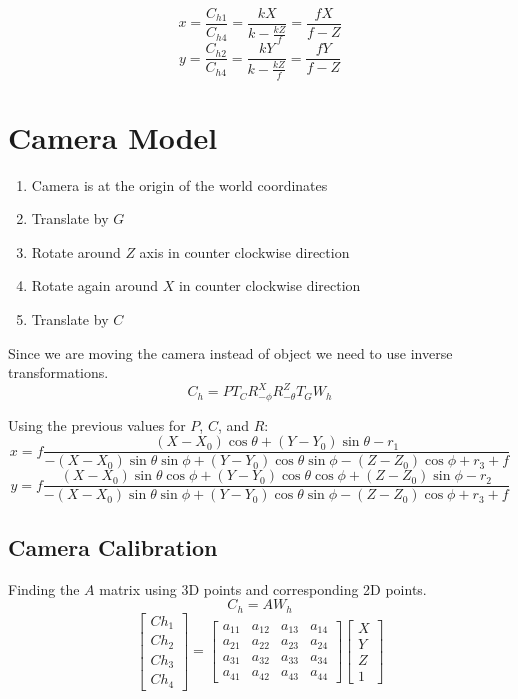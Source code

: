 \documentclass{article}
\begin{document}
\[x=\frac{C_{h1}}{C_{h4}}=\frac{kX}{k-\frac{kZ}{f}}=\frac{fX}{f-Z}\]
\[y=\frac{C_{h2}}{C_{h4}}=\frac{kY}{k-\frac{kZ}{f}}=\frac{fY}{f-Z}\]

\section*{Camera Model}
\begin{enumerate}
    \item Camera is at the origin of the world coordinates
    \item Translate by $G$
    \item Rotate around $Z$ axis in counter clockwise direction
    \item Rotate again around $X$ in counter clockwise direction
    \item Translate by $C$
\end{enumerate}
Since we are moving the camera instead of object we need to use inverse transformations.
\[C_h=P T_C R_{-\phi}^X R_{-\theta}^Z T_G W_h\]

Using the previous values for $P$, $C$, and $R$:
\[x=f\frac{(X-X_0)\cos\theta + (Y-Y_0)\sin\theta - r_1}{-(X-X_0)\sin\theta\sin\phi +
(Y-Y_0)\cos\theta\sin\phi - (Z-Z_0)\cos\phi + r_3 + f}\]
\[y=f\frac{(X-X_0)\sin\theta\cos\phi + (Y-Y_0)\cos\theta\cos\phi + (Z-Z_0)\sin\phi -
r_2}{-(X-X_0)\sin\theta\sin\phi + (Y-Y_0)\cos\theta\sin\phi - (Z-Z_0)\cos\phi + r_3 + f}\]

\subsection*{Camera Calibration}

Finding the $A$ matrix using 3D points and corresponding 2D points.
\[C_h=AW_h\]
\[\begin{bmatrix}
    Ch_1 \\ Ch_2 \\ Ch_3 \\ Ch_4
\end{bmatrix} = \begin{bmatrix}
    a_{11} & a_{12} & a_{13} & a_{14} \\
    a_{21} & a_{22} & a_{23} & a_{24} \\
    a_{31} & a_{32} & a_{33} & a_{34} \\
    a_{41} & a_{42} & a_{43} & a_{44}
\end{bmatrix}\begin{bmatrix}
    X \\ Y \\ Z \\ 1
\end{bmatrix}\]
\end{document}
